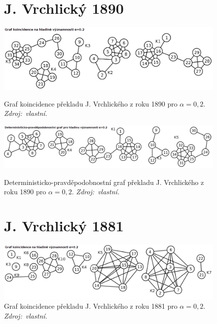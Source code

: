 \documentclass[dp.tex]{subfiles}
\begin{document}
\begin{figure}[h]
\section*{J. Vrchlický 1890}
{
	\centering
	\includegraphics[max width=\textwidth,keepaspectratio=true]{imgs-99-priloha-d/c_k_20}
	\caption[Graf koincidence překladu J. Vrchlického z roku 1890 pro $\alpha = 0{,}2$]
            {Graf koincidence překladu J. Vrchlického z roku 1890 pro $\alpha = 0{,}2$. \textit{Zdroj:~vlastní.}}
	\label{fig:c_k_20}

	\vspace*{0.5cm}

	\includegraphics[max width=\textwidth,keepaspectratio=true]{imgs-99-priloha-d/c_d_20}
	\caption[Deterministicko-pravděpodobnostní graf překladu J. Vrchlického z roku 1890 pro $\alpha = 0{,}2$]
            {Deterministicko-pravděpodobnostní graf překladu J. Vrchlického z roku 1890 pro $\alpha = 0{,}2$. \textit{Zdroj:~vlastní.}}
	\label{fig:c_d_20}
}

	\vspace*{1cm}

\section*{J. Vrchlický 1881}
	\centering
	\includegraphics[max width=\textwidth,keepaspectratio=true]{imgs-99-priloha-d/b_k_20}
	\caption[Graf koincidence překladu J. Vrchlického z roku 1881 pro $\alpha = 0{,}2$]
            {Graf koincidence překladu J. Vrchlického z roku 1881 pro $\alpha = 0{,}2$. \textit{Zdroj:~vlastní.}}
	\label{fig:b_k_20}


\end{figure}
\end{document}
